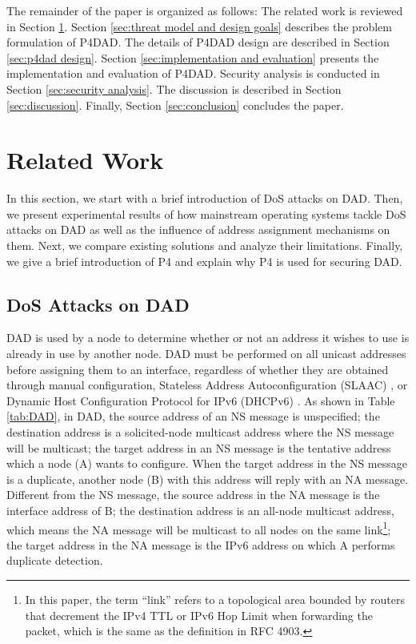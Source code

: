\documentclass[a4paper,fleqn]{cas-dc}
\begin{document}
    The remainder of the paper is organized as follows: The related work is reviewed in Section \ref{sec:related work}. Section \ref{sec:threat model and design goals} describes the problem formulation of P4DAD. The details of P4DAD design are described in Section \ref{sec:p4dad design}. Section \ref{sec:implementation and evaluation} presents the implementation and evaluation of P4DAD. Security analysis is conducted in Section \ref{sec:security analysis}. The discussion is described in Section \ref{sec:discussion}. Finally, Section \ref{sec:conclusion} concludes the paper. 




\section{Related Work}\label{sec:related work}
    In this section, we start with a brief introduction of DoS attacks on DAD. Then, we present experimental results of how mainstream operating systems tackle DoS attacks on DAD as well as the influence of address assignment mechanisms on them. Next, we compare existing solutions and analyze their limitations. Finally, we give a brief introduction of P4 and explain why P4 is used for securing DAD.

    \subsection{DoS Attacks on DAD}
        DAD is used by a node to determine whether or not an address it wishes to use is already in use by another node.
        DAD must be performed on all unicast addresses before assigning them to an interface, regardless of whether they are obtained through manual configuration, Stateless Address Autoconfiguration (SLAAC) \cite{slaac}, or Dynamic Host Configuration Protocol for IPv6 (DHCPv6) \cite{DHCPv6}.
        As shown in Table \ref{tab:DAD}, in DAD, the source address of an NS message is unspecified; the destination address is a solicited-node multicast address where the NS message will be multicast; the target address in an NS message is the tentative address which a node (A) wants to configure.
        When the target address in the NS message is a duplicate, another node (B) with this address will reply with an NA message. Different from the NS message, the source address in the NA message is the interface address of B; the destination address is an all-node multicast address, which means the NA message will be multicast to all nodes on the same link\footnote{In this paper, the term ``link'' refers to a topological area bounded by routers that decrement the IPv4 TTL or IPv6 Hop Limit when forwarding the packet, which is the same as the definition in RFC 4903\cite{rfc4903}.}; the target address in the NA message is the IPv6 address on which A performs duplicate detection.
        
\end{document}

